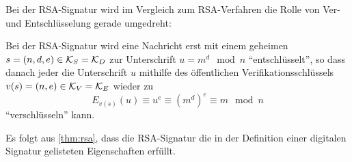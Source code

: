 \begin{remark}
 Bei der RSA-Signatur wird im Vergleich zum RSA-Verfahren die Rolle von Ver- und Entschlüsselung gerade umgedreht: 
 
 Bei der RSA-Signatur wird eine Nachricht erst mit einem geheimen $s = (n, d, e) \in \mathcal K_S = \mathcal K_D$ zur Unterschrift $u = m^d \mod n$ \enquote{entschlüsselt}, so dass danach jeder die Unterschrift $u$ mithilfe des öffentlichen Verifikationsschlüssels $v(s) = (n, e) \in \mathcal K_V = \mathcal K_E$ wieder zu 
 \[E_{v(s)}(u) \equiv u^e \equiv (m^d)^e \equiv m \mod n\]
 \enquote{verschlüsseln} kann.
\end{remark}

\begin{remark}
 Es folgt aus \ref{thm:rsa}, dass die RSA-Signatur die in der Definition einer digitalen Signatur gelisteten Eigenschaften erfüllt.
\end{remark}


